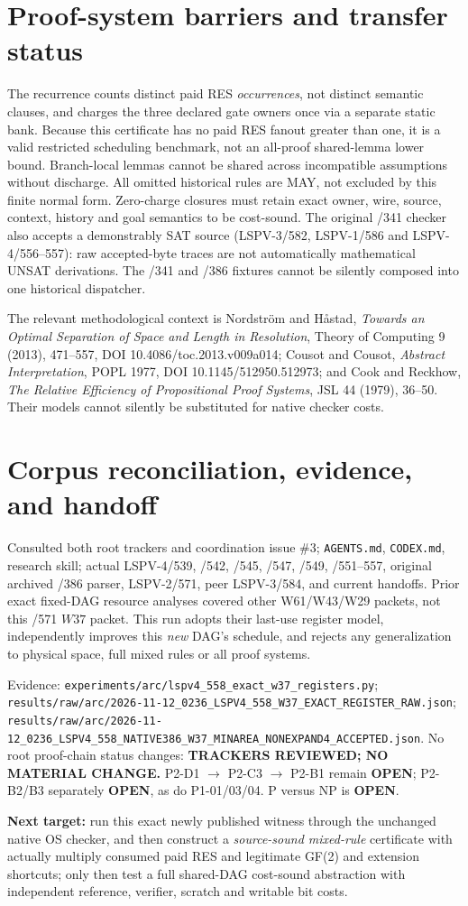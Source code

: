 \documentclass[11pt]{article}
\begin{document}
\section*{Proof-system barriers and transfer status}
The recurrence counts distinct paid RES \emph{occurrences}, not distinct semantic clauses, and charges the three declared gate owners once via a separate static bank. Because this certificate has no paid RES fanout greater than one, it is a valid restricted scheduling benchmark, not an all-proof shared-lemma lower bound. Branch-local lemmas cannot be shared across incompatible assumptions without discharge. All omitted historical rules are MAY, not excluded by this finite normal form. Zero-charge closures must retain exact owner, wire, source, context, history and goal semantics to be cost-sound. The original /341 checker also accepts a demonstrably SAT source (LSPV-3/582, LSPV-1/586 and LSPV-4/556--557): raw accepted-byte traces are not automatically mathematical UNSAT derivations. The /341 and /386 fixtures cannot be silently composed into one historical dispatcher.

The relevant methodological context is Nordstr\"om and H\aa stad, \emph{Towards an Optimal Separation of Space and Length in Resolution}, Theory of Computing 9 (2013), 471--557, DOI 10.4086/toc.2013.v009a014; Cousot and Cousot, \emph{Abstract Interpretation}, POPL 1977, DOI 10.1145/512950.512973; and Cook and Reckhow, \emph{The Relative Efficiency of Propositional Proof Systems}, JSL 44 (1979), 36--50. Their models cannot silently be substituted for native checker costs.

\section*{Corpus reconciliation, evidence, and handoff}
Consulted both root trackers and coordination issue \#3; \texttt{AGENTS.md}, \texttt{CODEX.md}, research skill; actual LSPV-4/539, /542, /545, /547, /549, /551--557, original archived /386 parser, LSPV-2/571, peer LSPV-3/584, and current handoffs. Prior exact fixed-DAG resource analyses covered other W61/W43/W29 packets, not this /571 $W37$ packet. This run adopts their last-use register model, independently improves this \emph{new} DAG's schedule, and rejects any generalization to physical space, full mixed rules or all proof systems.

Evidence: \texttt{experiments/arc/lspv4\_558\_exact\_w37\_registers.py};
\texttt{results/raw/arc/2026-11-12\_0236\_LSPV4\_558\_W37\_EXACT\_REGISTER\_RAW.json};
\texttt{results/raw/arc/2026-11-12\_0236\_LSPV4\_558\_NATIVE386\_W37\_MINAREA\_NONEXPAND4\_ACCEPTED.json}.
No root proof-chain status changes: \textbf{TRACKERS REVIEWED; NO MATERIAL CHANGE.}
P2-D1 $\to$ P2-C3 $\to$ P2-B1 remain \textbf{OPEN}; P2-B2/B3 separately \textbf{OPEN}, as do P1-01/03/04. P versus NP is \textbf{OPEN}.

\textbf{Next target:} run this exact newly published witness through the unchanged native OS checker, and then construct a \emph{source-sound mixed-rule} certificate with actually multiply consumed paid RES and legitimate GF(2) and extension shortcuts; only then test a full shared-DAG cost-sound abstraction with independent reference, verifier, scratch and writable bit costs.
\end{document}
